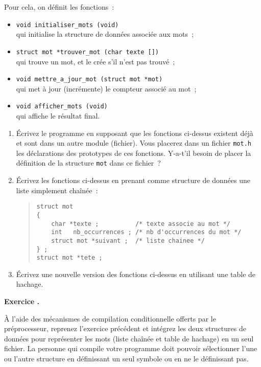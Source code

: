 \documentclass [twoside] {report}
\newcounter {td}
\newcounter {question} [td]
\renewcommand {\thequestion} {\arabic{td}.\arabic {question}}
\newcommand {\question}
    {
        \refstepcounter {question}
        \bigskip
        {\Large\bf Exercice \thequestion} %
        \nopagebreak
        \bigskip

        \nopagebreak
    }
\newcounter {tp}
\newcounter {exercice} [tp]
\begin{document}
Pour cela, on définit les fonctions~:

\begin {itemize}
    \item \verb:void initialiser_mots (void): \\
	qui initialise la structure de données associée aux mots~;

    \item \verb:struct mot *trouver_mot (char texte []): \\
	qui trouve un mot, et le crée s'il n'est pas trouvé~;

    \item \verb:void mettre_a_jour_mot (struct mot *mot): \\
	qui met à jour (incrémente) le compteur associé au mot~;

    \item \verb:void afficher_mots (void): \\
	qui affiche le résultat final.

\end {itemize}


\begin {enumerate}
    \item Écrivez le programme en supposant que les fonctions
	ci-dessus existent déjà et sont dans un autre module (fichier).
	Vous placerez dans un fichier {\tt mot.h} les déclarations des
	prototypes de ces fonctions.  Y-a-t'il besoin de placer la
	définition de la structure {\tt mot} dans ce fichier~?

    \item Écrivez les fonctions ci-dessus en prenant comme structure
	de données une liste simplement chaînée~:

\begin {quote}
\small
\begin {verbatim}
struct mot
{
    char *texte ;          /* texte associe au mot */
    int   nb_occurrences ; /* nb d'occurrences du mot */
    struct mot *suivant ;  /* liste chainee */
} ;
struct mot *tete ;
\end{verbatim}
\end {quote}

    \item Écrivez une nouvelle version des fonctions ci-dessus en
	utilisant une table de hachage.

\end {enumerate}


\question

\`A l'aide des mécanismes de compilation conditionnelle offerts par le
préprocesseur, reprenez l'exercice précédent et intégrez les deux
structures de données pour représenter les mots (liste chaînée et table
de hachage) en un seul fichier. La personne qui compile votre programme
doit pouvoir sélectionner l'une ou l'autre structure en définissant un
seul symbole ou en ne le définissant pas.
\end{document}
